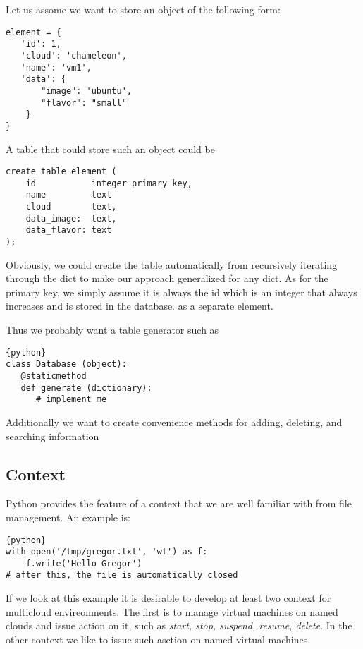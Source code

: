 Let us assome we want to store an object of the following form:

\begin{verbatim}
element = {
   'id': 1,
   'cloud': 'chameleon',
   'name': 'vm1',
   'data': {
       "image": 'ubuntu',
       "flavor": "small"
    }
}
\end{verbatim}

A table that could store such an object could be

\begin{verbatim}
create table element (
    id           integer primary key,
    name         text
    cloud        text,
    data_image:  text,
    data_flavor: text
);
\end{verbatim}

Obviously, we could create the table automatically from recursively
iterating through the dict to make our approach generalized for any
dict. As for the primary key, we simply assume it is always the id
which is an integer that always increases and is stored in the database.
as a separate element.

Thus we probably want a table generator such as

\begin{lstlisting}{python}
class Database (object):
   @staticmethod
   def generate (dictionary):
      # implement me
\end{lstlisting}

Additionally we want to create convenience methods for adding,
deleting, and searching information


\subsection{Context}

Python provides the feature of a context that we are well familiar
with from file management. An example is:

\begin{lstlisting}{python}
with open('/tmp/gregor.txt', 'wt') as f:
    f.write('Hello Gregor')
# after this, the file is automatically closed
\end{lstlisting}

If we look at this example it is desirable to develop at least two
context for multicloud envireonments. The first is to manage virtual
machines on named clouds and issue action on it, such as {\em start, stop,
  suspend, resume, delete}. In the other context we like to issue
such asction on named virtual machines.

